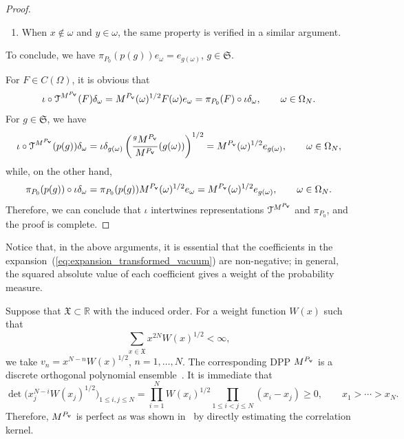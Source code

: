 \documentclass[pdftex]{sigma}
\numberwithin{equation}{section}
\newcommand{\pr}[1]{#1^{\prime}}
\newcommand{\mfrak}[1]{\mathfrak{#1}}
\newcommand{\mcal}[1]{\mathcal{#1}}
\newcommand{\mbb}[1]{\mathbb{#1}}
\begin{document}
\begin{proof}
\begin{enumerate}
\begin{gather*}
					\pi_{P_{0}}(1+\eta_{x}\eta_{y})e_{\omega}=0, \qquad
					\pi_{P_{0}}(1-\eta_{x}\eta_{y})e_{\omega}=2e_{\omega}, \qquad
					\pi_{P_{0}}(\eta_{(x,y)})e_{\omega}=(-1)^{\ell_{2}}e_{\omega}.
				\end{gather*}
				These properties verify that
				\begin{equation*}
					\pi_{P_{0}}(p(s_{x,y}))e_{\omega}=e_{\pr{\omega}}.
				\end{equation*}
		\item 	When $x\not\in\omega$ and $y\in\omega$, the same property is verified in a similar argument.
		\end{enumerate}
		To conclude, we have $\pi_{P_{0}}(p(g))e_{\omega}=e_{g(\omega)}$, $g\in\mfrak{S}$.

For $F\in C(\Omega)$, it is obvious that
\begin{equation*}
	\iota\circ \mcal{T}^{M^{P_{{\bf v}}}}(F)\delta_{\omega}=M^{P_{{\bf v}}}(\omega)^{1/2}F(\omega)e_{\omega}=\pi_{P_{0}}(F)\circ \iota \delta_{\omega},\qquad \omega\in\Omega_{N}.
\end{equation*}
For $g\in\mfrak{S}$, we have
\begin{equation*}
	\iota\circ \mcal{T}^{M^{P_{{\bf v}}}}(p(g))\delta_{\omega}=\iota \delta_{g(\omega)}\left(\frac{{}^{g}M^{P_{{\bf v}}}}{M^{P_{{\bf v}}}}(g(\omega))\right)^{1/2}=M^{P_{{\bf v}}}(\omega)^{1/2}e_{g(\omega)},\qquad \omega\in\Omega_{N},
\end{equation*}
while, on the other hand,
\begin{equation*}
	\pi_{P_{0}}(p(g))\circ \iota \delta_{\omega}=\pi_{P_{0}}(p(g)) M^{P_{{\bf v}}}(\omega)^{1/2}e_{\omega}=M^{P_{{\bf v}}}(\omega)^{1/2}e_{g(\omega)},\qquad \omega\in \Omega_{N}.
\end{equation*}
Therefore, we can conclude that $\iota$ intertwines representations $\mcal{T}^{M^{P_{{\bf v}}}}$ and $\pi_{P_{0}}$, and the proof is complete.
\end{proof}

Notice that, in the above arguments, it is essential that the coefficients in the expansion~(\ref{eq:expansion_transformed_vacuum}) are non-negative; in general, the squared absolute value of each coefficient gives a weight of the probability measure.

\begin{Example}
Suppose that $\mfrak{X}\subset\mbb{R}$ with the induced order.
For a weight function $W(x)$ such that
\begin{equation*}
	\sum_{x\in\mfrak{X}}x^{2N}W(x)^{1/2}<\infty,
\end{equation*}
we take $v_{n}=x^{N-n}W(x)^{1/2}$, $n=1,\dots, N$. The corresponding DPP $M^{P_{{\bf v}}}$ is a discrete orthogonal polynomial ensemble~\cite{Konig2005}.
It is immediate that
\begin{equation*}
	\det \big(x^{N-i}_{j}W(x_{j})^{1/2}\big)_{1\le i,j\le N}=\prod_{i=1}^{N}W(x_{i})^{1/2}\prod_{1\le i<j\le N}(x_{i}-x_{j})\ge 0,\qquad x_{1}>\cdots >x_{N}.
\end{equation*}
Therefore, $M^{P_{{\bf v}}}$ is perfect as was shown in~\cite{Olshanski2020} by directly estimating the correlation kernel.
\end{Example}
\end{document}

